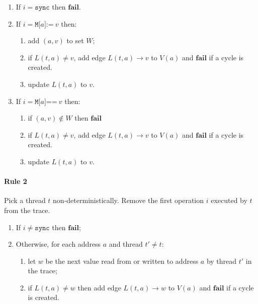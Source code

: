 \documentclass[11pt]{article}
\begin{document}
\begin{enumerate}
\item 
     If $i = \texttt{sync}$ then $\textbf{fail}$.

\item 
     If $i = \texttt{M[}a\texttt{]:=}~v$ then:

\begin{enumerate}
\item
     add $(a, v)$ to set $W$;
\item
     if $L(t,a) \neq v$, add edge $L(t, a) \rightarrow v$ to $V(a)$
     and $\textbf{fail}$ if a cycle is created.
\item
     update $L(t,a)$ to $v$.
\end{enumerate}

\item 
     If $i = \texttt{M[}a\texttt{]==}~v$ then:

\begin{enumerate}
\item
     if $(a, v) \notin W$ then $\textbf{fail}$
\item
     if $L(t,a) \neq v$, add edge $L(t, a) \rightarrow v$ to $V(a)$
     and $\textbf{fail}$ if a cycle is created.
\item
     update $L(t,a)$ to $v$.
\end{enumerate}

\end{enumerate}

\paragraph{Rule 2}

Pick a thread $t$ non-deterministically.  Remove the first operation
$i$ executed by $t$ from the trace.

\begin{enumerate}
\item
     If $i \neq \texttt{sync}$ then $\textbf{fail}$;
\item
     Otherwise, for each address $a$ and thread $t' \neq t$:
\begin{enumerate}
\item
     let $w$ be the next value read from or written to address $a$ by
     thread $t'$ in the trace;
\item
     if $L(t,a) \neq w$ then add edge $L(t,a) \rightarrow w$ to $V(a)$
     and $\textbf{fail}$ if a cycle is created.

\end{enumerate}
\end{enumerate}
\end{document}
